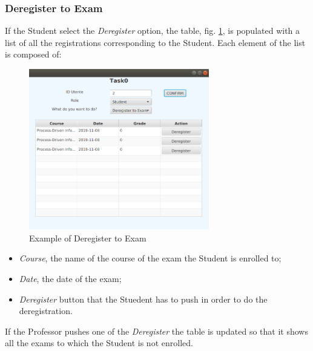 \documentclass{report}
\begin{document}
\subsubsection*{Deregister to Exam}
If the Student select the \textit{Deregister} option, the table, fig. \ref{fig:DeregisterToExam}, is populated with a list of all the registrations corresponding to the Student. Each element of the list is composed of:
\begin{figure} [h!]
	\centering
	\includegraphics[width=0.7\textwidth]{DeregisterToExam.png}
	\caption{Example of Deregister to Exam}
	\label{fig:DeregisterToExam}
\end{figure}
\begin{itemize}
	\item \textit{Course}, the name of the course of the exam the Student is enrolled to;
	\item \textit{Date}, the date of the exam;
	\item \textit{Deregister} button that the Stuedent has to push in order to do the deregistration. 
\end{itemize}
If the Professor pushes one of the \textit{Deregister} the table is updated so that it shows all the exams to which the Student is not enrolled.
\end{document}
